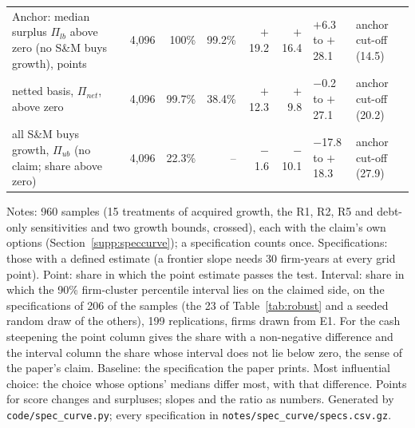 \begin{table}[t]
\begin{tabular}{@{}>{\raggedright\arraybackslash}p{4.9cm}rrrrr>{\raggedright\arraybackslash}p{2.0cm}>{\raggedright\arraybackslash}p{2.4cm}@{}}
Anchor: median surplus $\Pi_{lb}$ above zero (no S\&M buys growth), points & 4{,}096 & 100\% & 99.2\% & $+$19.2 & $+$16.4 & $+$6.3 to $+$28.1 & anchor cut-off (14.5)\\
\quad netted basis, $\Pi_{net}$, above zero & 4{,}096 & 99.7\% & 38.4\% & $+$12.3 & $+$9.8 & $-$0.2 to $+$27.1 & anchor cut-off (20.2)\\
\quad all S\&M buys growth, $\Pi_{ub}$ (no claim; share above zero) & 4{,}096 & 22.3\% & -- & $-$1.6 & $-$10.1 & $-$17.8 to $+$18.3 & anchor cut-off (27.9)\\
\bottomrule\end{tabular}
\par\vspace{2pt}\footnotesize\raggedright Notes: 960 samples (15 treatments of acquired growth, the R1, R2, R5 and debt-only sensitivities and two growth bounds, crossed), each with the claim's own options (Section~\ref{supp:speccurve}); a specification counts once. Specifications: those with a defined estimate (a frontier slope needs 30 firm-years at every grid point). Point: share in which the point estimate passes the test. Interval: share in which the 90\% firm-cluster percentile interval lies on the claimed side, on the specifications of 206 of the samples (the 23 of Table~\ref{tab:robust} and a seeded random draw of the others), 199 replications, firms drawn from E1. For the cash steepening the point column gives the share with a non-negative difference and the interval column the share whose interval does not lie below zero, the sense of the paper's claim. Baseline: the specification the paper prints. Most influential choice: the choice whose options' medians differ most, with that difference. Points for score changes and surpluses; slopes and the ratio as numbers. Generated by \texttt{code/spec\_curve.py}; every specification in \texttt{notes/spec\_curve/specs.csv.gz}.
\end{table}
